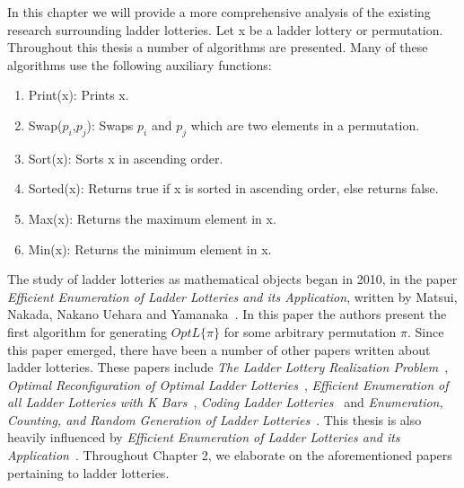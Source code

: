 
In this chapter we will provide a more comprehensive analysis of the existing research surrounding ladder lotteries. Let {\sc x} be 
a ladder lottery or permutation. 
Throughout this thesis a number of algorithms are presented. Many of these algorithms use the following auxiliary functions: 
\begin{enumerate}
    \item {\sc Print(x)}: Prints {\sc x}.
    \item {\sc Swap}($p_{i}$,$p_{j}$): Swaps $p_{i}$ and $p_{j}$ which are two elements in a permutation.
    \item {\sc Sort(x)}: Sorts {\sc x} in ascending order.
    \item {\sc Sorted(x)}: Returns true if {\sc x} is sorted in ascending order, else returns false.
    \item {\sc Max(x)}: Returns the maximum element in {\sc x}.
    \item {\sc Min(x)}: Returns the minimum element in {\sc x}.
\end{enumerate}

The study of ladder lotteries as mathematical objects began in 2010, in the paper
\emph{Efficient Enumeration of Ladder Lotteries and its Application}, written by Matsui, Nakada, Nakano Uehara and Yamanaka~\cite{A1}. 
In this paper the authors present the first algorithm for generating $OptL\{\pi\}$ for some  
arbitrary permutation $\pi$. Since this paper emerged, there have been 
a number of other papers written about ladder lotteries.
These papers include \emph{The Ladder Lottery Realization Problem}~\cite{A3},
\emph{Optimal Reconfiguration of Optimal Ladder Lotteries}~\cite{A2}, 
\emph{Efficient Enumeration of all Ladder Lotteries with K Bars}~\cite{A4},
\emph{Coding Ladder Lotteries}~\cite{A5} and
\emph{Enumeration, Counting, and Random Generation of Ladder Lotteries}~\cite{A6}.
This thesis is also heavily influenced by \emph{Efficient Enumeration of Ladder Lotteries and its Application}~\cite{A1}. Throughout Chapter 2, 
we elaborate on the aforementioned papers pertaining to ladder lotteries.


